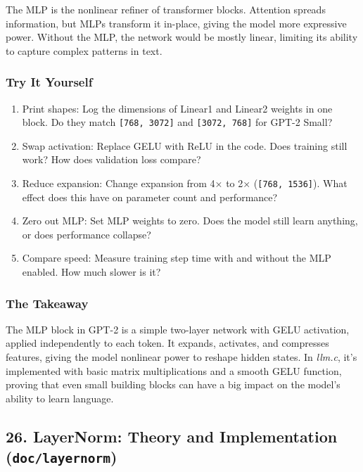 \documentclass[
  letterpaper,
  DIV=11,
  numbers=noendperiod]{scrreprt}
\providecommand{\tightlist}{%
  \setlength{\itemsep}{0pt}\setlength{\parskip}{0pt}}
\begin{document}
The MLP is the nonlinear refiner of transformer blocks. Attention
spreads information, but MLPs transform it in-place, giving the model
more expressive power. Without the MLP, the network would be mostly
linear, limiting its ability to capture complex patterns in text.

\subsubsection{Try It Yourself}\label{try-it-yourself-14}

\begin{enumerate}
\def\labelenumi{\arabic{enumi}.}
\tightlist
\item
  Print shapes: Log the dimensions of Linear1 and Linear2 weights in one
  block. Do they match \texttt{{[}768,\ 3072{]}} and
  \texttt{{[}3072,\ 768{]}} for GPT-2 Small?
\item
  Swap activation: Replace GELU with ReLU in the code. Does training
  still work? How does validation loss compare?
\item
  Reduce expansion: Change expansion from 4× to 2×
  (\texttt{{[}768,\ 1536{]}}). What effect does this have on parameter
  count and performance?
\item
  Zero out MLP: Set MLP weights to zero. Does the model still learn
  anything, or does performance collapse?
\item
  Compare speed: Measure training step time with and without the MLP
  enabled. How much slower is it?
\end{enumerate}

\subsubsection{The Takeaway}\label{the-takeaway-14}

The MLP block in GPT-2 is a simple two-layer network with GELU
activation, applied independently to each token. It expands, activates,
and compresses features, giving the model nonlinear power to reshape
hidden states. In \emph{llm.c}, it's implemented with basic matrix
multiplications and a smooth GELU function, proving that even small
building blocks can have a big impact on the model's ability to learn
language.

\subsection{\texorpdfstring{26. LayerNorm: Theory and Implementation
(\texttt{doc/layernorm})}{26. LayerNorm: Theory and Implementation (doc/layernorm)}}\label{layernorm-theory-and-implementation-doclayernorm}
\end{document}
